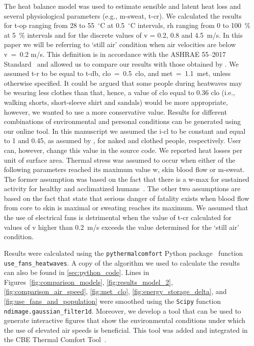 The heat balance model was used to estimate sensible and latent heat loss and several physiological parameters (e.g., \ac{m-sweat}, \ac{t-cr}).
We calculated the results for \ac{t-op} ranging from 28 to 55~$^{\circ}$C at 0.5~$^{\circ}$C intervals, \ac{rh} ranging from 0 to 100~\% at 5~\% intervals and for the discrete values of \ac{v} = 0.2, 0.8 and 4.5~m/s.
In this paper we will be referring to `still air' condition when air velocities are below \ac{v}~=~0.2 m/s.
This definition is in accordance with the ASHRAE 55--2017 Standard~\cite{ashrae552017} and allowed us to compare our results with those obtained by .
We assumed \ac{t-r} to be equal to \ac{t-db}, \ac{clo}~=~0.5~clo, and \ac{met}~=~1.1~met, unless otherwise specified.
It could be argued that some people during heatwaves may be wearing less clothes than that, hence, a value of \ac{clo} equal to 0.36 clo (i.e., walking shorts, short-sleeve shirt and sandals) would be more appropriate, however, we wanted to use a more conservative value.
Results for different combinations of environmental and personal conditions can be generated using our online tool.
In this manuscript we assumed the \ac{i-cl} to be constant and equal to 1 and 0.45, as assumed by , for naked and clothed people, respectively.
User can, however, change this value in the source code.
We reported heat losses per unit of surface area.
Thermal stress was assumed to occur when either of the following parameters reached its maximum value \ac{w}, skin blood flow or \ac{m-sweat}.
The former assumption was based on the fact that there is a \ac{w-max} for sustained activity for healthy and acclimatized humans~\cite{ASHRA2017}.
The other two assumptions are based on the fact that  state that serious danger of fatality exists when blood flow from core to skin is maximal or sweating reaches its maximum.
We assumed that the use of electrical fans is detrimental when the value of \ac{t-cr} calculated for values of \ac{v} higher than 0.2~m/s exceeds the value determined for the `still air' condition.

Results were calculated using the  \verb|pythermalcomfort| Python package~\cite{Tartarini2020a} function \verb|use_fans_heatwaves|.
A copy of the algorithm we used to calculate the results can also be found in \ref{sec:python_code}.
Lines in Figures~\ref{fig:comparison_models}, \ref{fig:results_model_2}, \ref{fig:comparison_air_speed}, \ref{fig:met_clo}, \ref{fig:energy_storage_delta}, and \ref{fig:use_fans_and_population} were smoothed using the \verb|Scipy| function \verb|ndimage.gaussian_filter1d|.
Moreover, we develop a tool that can be used to generate interactive figures that show the environmental conditions under which the use of elevated air speeds is beneficial.
This tool was added and integrated in the CBE Thermal Comfort Tool~\cite{Tartarini2020}.

